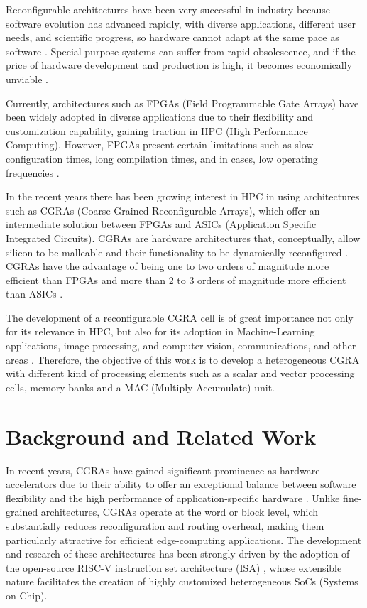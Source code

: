 \documentclass[conference]{IEEEtran}
\begin{document}
Reconfigurable architectures have been very successful in industry because software evolution has advanced rapidly, with diverse applications,
different user needs, and scientific progress, so hardware cannot adapt at the same pace as software \cite{LeiboLiu}. Special-purpose systems
can suffer from rapid obsolescence, and if the price of hardware development and production is high, it becomes economically unviable \cite{LeiboLiu}.

Currently, architectures such as FPGAs (Field Programmable Gate Arrays) have been widely adopted in diverse applications due to their flexibility and customization capability, gaining traction in HPC (High Performance Computing).
However, FPGAs present certain limitations such as slow configuration times, long compilation times, and in cases, low operating frequencies \cite{Podobas}.

In the recent years there has been growing interest in HPC in using architectures such as CGRAs (Coarse-Grained Reconfigurable Arrays), which offer an intermediate solution between FPGAs and ASICs (Application Specific Integrated Circuits).
CGRAs are hardware architectures that, conceptually, allow silicon to be malleable and their functionality to be dynamically reconfigured \cite{Podobas}.
CGRAs have the advantage of being one to two orders of magnitude more efficient than FPGAs and more than 2 to 3 orders of magnitude more efficient than ASICs \cite{LeiboLiu}.

The development of a reconfigurable CGRA cell is of great importance not only for its relevance in HPC, but also for its adoption in Machine-Learning applications, image processing, and computer vision,
communications, and other areas \cite{dvhetero}. Therefore, the objective of this work is to develop a heterogeneous CGRA with different kind of processing elements such as a scalar and vector processing cells, memory banks and a MAC (Multiply-Accumulate) unit. 




\section{Background and Related Work}
In recent years, CGRAs have gained significant prominence as hardware accelerators due to their ability to offer an exceptional balance between software flexibility and the high performance of application-specific hardware \cite{LeiboLiu,Podobas}. 
Unlike fine-grained architectures, CGRAs operate at the word or block level, which substantially reduces reconfiguration and routing overhead, making them particularly attractive for efficient edge-computing applications. 
The development and research of these architectures has been strongly driven by the adoption of the open-source RISC-V instruction set architecture (ISA) \cite{riscv}, whose extensible nature facilitates the creation of highly customized heterogeneous SoCs (Systems on Chip).
\end{document}
